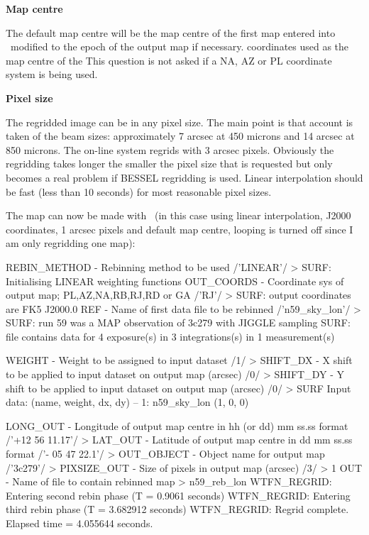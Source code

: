 \documentclass[twoside,11pt]{starlink}
\providecommand{\task}[1]{#1}
\providecommand{\rebin}{\htmlref{\task{rebin}}{REBIN}}
\begin{document}
\begin{description}
\item \textbf{Map centre}

The default map centre will be the map centre of the first map entered into
\rebin\ modified to the epoch of the output map if necessary.  coordinates
used as the map centre of the This question is not asked if a NA, AZ or PL
coordinate system is being used.

\item \textbf{Pixel size}

The regridded image can be in any pixel size. The main point is that account
is taken of the beam sizes: approximately 7 arcsec at 450 microns and 14
arcsec at 850 microns.  The on-line system regrids with 3 arcsec
pixels. Obviously the regridding takes longer the smaller the pixel size that
is requested but only becomes a real problem if BESSEL regridding is
used. Linear interpolation should be fast (less than 10 seconds) for most
reasonable pixel sizes.

\end{description}

The map can now be made with \rebin\ (in this case using linear interpolation,
J2000 coordinates, 1 arcsec pixels and default map centre, looping is turned
off since I am only regridding one map):
\begin{terminalv}
REBIN_METHOD - Rebinning method to be used /'LINEAR'/ >
SURF: Initialising LINEAR weighting functions
OUT_COORDS - Coordinate sys of output map; PL,AZ,NA,RB,RJ,RD or GA /'RJ'/ >
SURF: output coordinates are FK5 J2000.0
REF - Name of first data file to be rebinned /'n59_sky_lon'/ >
SURF: run 59 was a MAP observation of 3c279 with JIGGLE sampling
SURF: file contains data for 4 exposure(s) in 3 integrations(s) in 1
measurement(s)

WEIGHT - Weight to be assigned to input dataset /1/ >
SHIFT_DX - X shift to be applied to input dataset on output map (arcsec) /0/ >
SHIFT_DY - Y shift to be applied to input dataset on output map (arcsec) /0/ >
SURF Input data: (name, weight, dx, dy)
   -- 1: n59_sky_lon (1, 0, 0)

LONG_OUT - Longitude of output map centre in hh (or dd) mm ss.ss format /'+12
 56 11.17'/ >
LAT_OUT - Latitude of output map centre in dd mm ss.ss format /'- 05 47 22.1'/ >
OUT_OBJECT - Object name for output map /'3c279'/ >
PIXSIZE_OUT - Size of pixels in output map (arcsec) /3/ > 1
OUT - Name of file to contain rebinned map > n59_reb_lon
WTFN_REGRID: Entering second rebin phase (T = 0.9061 seconds)
WTFN_REGRID: Entering third rebin phase (T = 3.682912 seconds)
WTFN_REGRID: Regrid complete. Elapsed time = 4.055644 seconds.
\end{terminalv}
\end{document}
